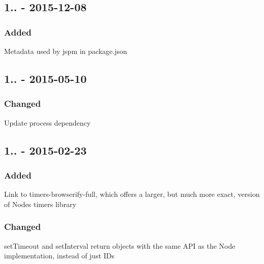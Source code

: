 \subsection*{1.. -\/ 2015-\/12-\/08}

\subsubsection*{Added}


\begin{DoxyItemize}
\item Metadata used by {\ttfamily jspm} in {\ttfamily package.\+json}
\end{DoxyItemize}

\subsection*{1.. -\/ 2015-\/05-\/10}

\subsubsection*{Changed}


\begin{DoxyItemize}
\item Update {\ttfamily process} dependency
\end{DoxyItemize}

\subsection*{1.. -\/ 2015-\/02-\/23}

\subsubsection*{Added}


\begin{DoxyItemize}
\item Link to {\ttfamily timers-\/browserify-\/full}, which offers a larger, but much more exact, version of Node\textquotesingle{}s {\ttfamily timers} library
\end{DoxyItemize}

\subsubsection*{Changed}


\begin{DoxyItemize}
\item {\ttfamily set\+Timeout} and {\ttfamily set\+Interval} return objects with the same A\+PI as the Node implementation, instead of just I\+Ds
\end{DoxyItemize}

